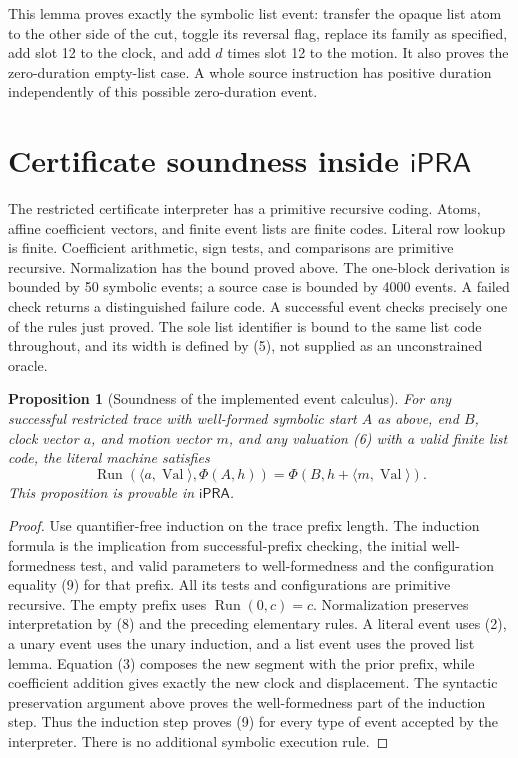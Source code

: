 \documentclass[11pt]{article}
\newtheorem{proposition}[theorem]{Proposition}
\newcommand{\ipra}{\mathsf{iPRA}}
\newcommand{\Run}{\operatorname{Run}}
\newcommand{\Val}{\operatorname{Val}}
\begin{document}
This lemma proves exactly the symbolic list event: transfer the opaque
list atom to the other side of the cut, toggle its reversal flag,
replace its family as specified, add slot 12 to the clock, and add
$d$ times slot 12 to the motion.  It also proves the zero-duration
empty-list case.  A whole source instruction has positive duration
independently of this possible zero-duration event.

\section{Certificate soundness inside \texorpdfstring{$\ipra$}{iPRA}}

The restricted certificate interpreter has a primitive recursive coding.
Atoms, affine coefficient vectors, and finite event lists are finite
codes.  Literal row lookup is finite.  Coefficient arithmetic, sign tests,
and comparisons are primitive recursive.  Normalization has the bound
proved above.  The one-block derivation is bounded by 50 symbolic events;
a source case is bounded by 4000 events.  A failed check returns a
distinguished failure code.  A successful event checks precisely one
of the rules just proved.  The sole list identifier is bound to the same
list code throughout, and its width is defined by (5), not supplied as
an unconstrained oracle.

\begin{proposition}[Soundness of the implemented event calculus]
For any successful restricted trace with well-formed symbolic start $A$
as above, end $B$, clock vector $a$, and motion vector $m$, and any
valuation (6) with a valid finite list code, the literal machine satisfies
\[
 \Run(\langle a,\Val\rangle,\Phi(A,h))
   =\Phi(B,h+\langle m,\Val\rangle).                             \tag{9}
\]
This proposition is provable in $\ipra$.
\end{proposition}

\begin{proof}
Use quantifier-free induction on the trace prefix length.  The induction
formula is the implication from successful-prefix checking, the initial
well-formedness test, and valid parameters to well-formedness and the
configuration equality (9) for that prefix.  All its tests and
configurations are primitive recursive.  The empty prefix
uses $\Run(0,c)=c$.  Normalization preserves interpretation by (8) and
the preceding elementary rules.  A literal event uses (2), a unary event
uses the unary induction, and a list event uses the proved list lemma.
Equation (3) composes the new segment with the prior prefix, while
coefficient addition gives exactly the new clock and displacement.
The syntactic preservation argument above proves the well-formedness
part of the induction step.
Thus the induction step proves (9) for every type of event accepted by
the interpreter.  There is no additional symbolic execution rule.
\end{proof}
\end{document}
